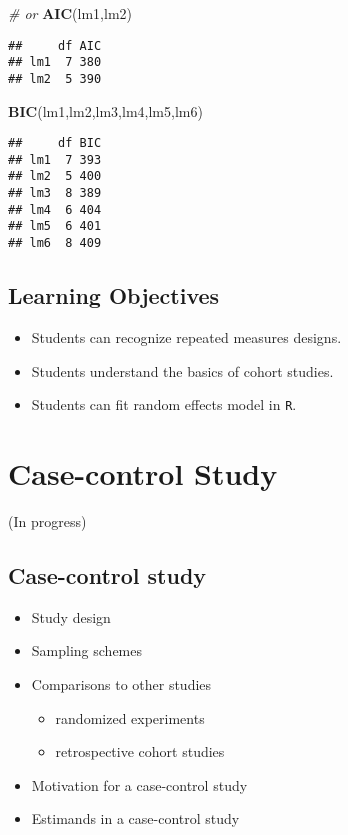 \documentclass[12pt,]{book}
\newenvironment{Shaded}{\begin{snugshade}}{\end{snugshade}}
\newcommand{\KeywordTok}[1]{\textcolor[rgb]{0.13,0.29,0.53}{\textbf{#1}}}
\newcommand{\CommentTok}[1]{\textcolor[rgb]{0.56,0.35,0.01}{\textit{#1}}}
\newcommand{\NormalTok}[1]{#1}
\providecommand{\tightlist}{%
  \setlength{\itemsep}{0pt}\setlength{\parskip}{0pt}}
\begin{document}
\begin{Shaded}
\begin{Highlighting}[]
\CommentTok{# or}
\KeywordTok{AIC}\NormalTok{(lm1,lm2)}
\end{Highlighting}
\end{Shaded}

\begin{verbatim}
##     df AIC
## lm1  7 380
## lm2  5 390
\end{verbatim}

\begin{Shaded}
\begin{Highlighting}[]
\KeywordTok{BIC}\NormalTok{(lm1,lm2,lm3,lm4,lm5,lm6)}
\end{Highlighting}
\end{Shaded}

\begin{verbatim}
##     df BIC
## lm1  7 393
## lm2  5 400
## lm3  8 389
## lm4  6 404
## lm5  6 401
## lm6  8 409
\end{verbatim}

\section{Learning Objectives}\label{learning-objectives-4}

\begin{itemize}
\tightlist
\item
  Students can recognize repeated measures designs.
\item
  Students understand the basics of cohort studies.
\item
  Students can fit random effects model in \texttt{R}.
\end{itemize}

\chapter{Case-control Study}\label{ch:case}

(In progress)

\section{Case-control study}\label{case-control-study}

\begin{itemize}
\tightlist
\item
  Study design
\item
  Sampling schemes
\item
  Comparisons to other studies

  \begin{itemize}
  \tightlist
  \item
    randomized experiments
  \item
    retrospective cohort studies
  \end{itemize}
\item
  Motivation for a case-control study
\item
  Estimands in a case-control study
\end{itemize}
\end{document}
